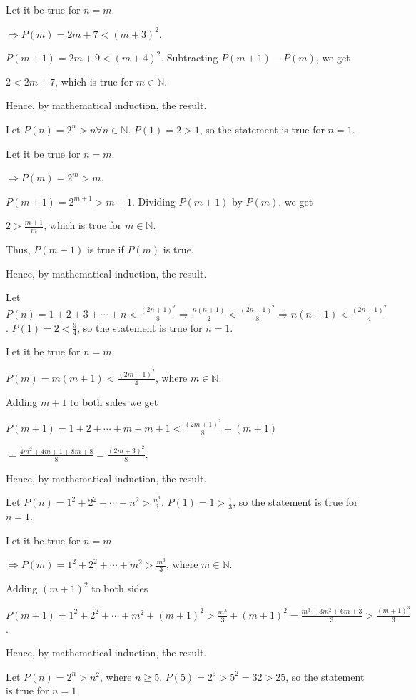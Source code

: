   Let it be true for $n = m$.

  $\Rightarrow P(m) = 2m + 7 < (m + 3)^2$.

  $P(m + 1) = 2m + 9 < (m + 4)^2$. Subtracting $P(m + 1) - P(m)$, we get

  $2 < 2m + 7$, which is true for $m\in\mathbb{N}$.

  Hence, by mathematical induction, the result.
\item Let $P(n) = 2^n > n\forall n\in\mathbb{N}$. $P(1) = 2 > 1$, so the statement is true for $n = 1$.

  Let it be true for $n = m$.

  $\Rightarrow P(m) = 2^m > m$.

  $P(m + 1) = 2^{m + 1} > m + 1$. Dividing $P(m + 1)$ by $P(m)$, we get

  $2 > \frac{m + 1}{m}$, which is true for $m\in\mathbb{N}$.

  Thus, $P(m + 1)$ is true if $P(m)$ is true.

  Hence, by mathematical induction, the result.
\item Let $P(n) = 1 + 2 + 3 + \cdots + n < \frac{(2n + 1)^2}{8} \Rightarrow \frac{n(n + 1)}{2} < \frac{(2n +
  1)^2}{8} \Rightarrow n(n + 1) < \frac{(2n + 1)^2}{4}$. $P(1) = 2 < \frac{9}{4}$, so the statement is true
  for $n = 1$.

  Let it be true for $n = m$.

  $P(m) = m(m + 1) < \frac{(2m + 1)^2}{4}$, where $m\in\mathbb{N}$.

  Adding $m + 1$ to both sides we get

  $P(m + 1) = 1 + 2 + \cdots + m + m + 1 < \frac{(2m + 1)^2}{8} + (m + 1)$

  $= \frac{4m^2 + 4m + 1 + 8m + 8}{8}
  = \frac{(2m + 3)^2}{8}$.

  Hence, by mathematical induction, the result.
\item Let $P(n) = 1^2 + 2^2 + \cdots + n^2 > \frac{n^3}{3}$. $P(1) = 1 > \frac{1}{3}$, so the statement is
  true for $n = 1$.

  Let it be true for $n = m$.

  $\Rightarrow P(m) = 1^2 + 2^2 + \cdots + m^2 > \frac{m^3}{3}$, where $m\in\mathbb{N}$.

  Adding $(m + 1)^2$ to both sides

  $P(m + 1) = 1^2 + 2^2 + \cdots + m^2 + (m + 1)^2 > \frac{m^3}{3} + (m + 1)^2 = \frac{m^3 + 3m^2 + 6m +
    3}{3} > \frac{(m + 1)^3}{3}$.

  Hence, by mathematical induction, the result.
\item Let $P(n) = 2^n > n^2$, where $n \geq 5$. $P(5) = 2^5 > 5^2 = 32 > 25$, so the statement is true for
  $n = 1$.

